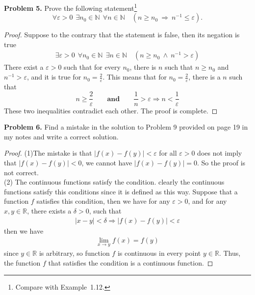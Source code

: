 \documentclass[12pt,leqno]{amsart}
\begin{document}
\medskip

\noindent
{\bf Problem 5.}
Prove the following statement\footnote{Compare with Example~1.12.}
$$
    \forall \varepsilon>0\ \ \exists n_0\in\mathbb{N}\ \ \forall n\in\mathbb{N} \quad
    (n\geq n_0\ \Rightarrow \ n^{-1}\leq \varepsilon).
$$
\begin{proof}
Suppose to the contrary that the statement is false, then its negation is true
\begin{align*}
    \exists \varepsilon>0\ \ \forall n_0\in\mathbb{N}\ \ \exists n\in\mathbb{N} \quad
    (n\geq n_0\ \wedge \ n^{-1} > \varepsilon)
\end{align*}
There exist a $\varepsilon > 0$ such that for every $n_0$, there is $n$ such that $n\geq n_0$ and $n^{-1} > \varepsilon$, and it is true for $n_0 = \frac{2}{\varepsilon}$. This means that for $n_0 = \frac{2}{\varepsilon}$, there is a $n$ such that
$$
    n \geq \frac{2}{\varepsilon} \qquad \textbf{and} \qquad \frac{1}{n} > \varepsilon \Rightarrow n < \frac{1}{\varepsilon}
$$
These two inequalities contradict each other. The proof is complete. 
\end{proof}


\medskip

\noindent
{\bf Problem 6.}
Find a mistake in the solution to Problem 9 provided on page 19 in my notes and write a correct solution.
\begin{proof}
(1)The mistake is that $\left|f(x)-f(y)\right| < \varepsilon$ for all $\varepsilon > 0$ does not imply that $\left|f(x)-f(y)\right| < 0$, we cannot have $\left|f(x)-f(y)\right| = 0$. So the proof is not correct.\\
\hspace*{2em}(2) The continuous functions satisfy the condition. clearly the continuous functions satisfy this conditions since it is defined as this way. Suppose that a function $f$ satisfies this condition, then we have for any $\varepsilon > 0$, and for any $x,y \in \mathbb{R}$, there exists a $\delta > 0$, such that 
\begin{align*}
    \left| x - y \right| < \delta \Rightarrow \left|f(x)-f(y)\right| < \varepsilon
\end{align*}
then we have 
\begin{align*}
    \lim_{x \rightarrow y} f(x) = f(y)
\end{align*}
since $y \in \mathbb{R}$ is arbitrary, so function $f$ is continuous in every point $y \in \mathbb{R}$. Thus, the function $f$ that satisfies the condition is a continuous function.
\end{proof}
\end{document}
